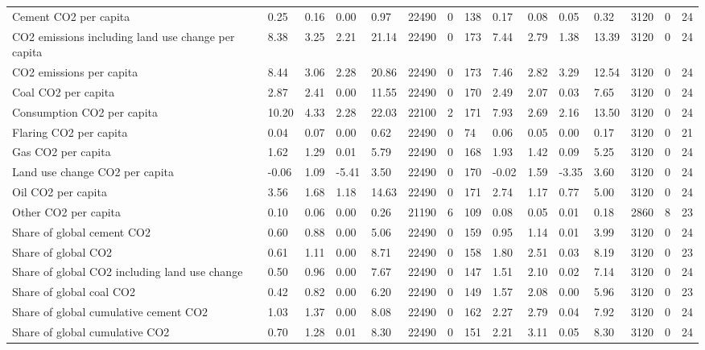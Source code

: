 \begin{longtable}{lllllllllllllll}
Cement CO2 per capita & 0.25 & 0.16 & 0.00 & 0.97 & 22490 & 0 & 138 & 0.17 & 0.08 & 0.05 & 0.32 & 3120 & 0 & 24\\
CO2 emissions including land use change per capita & 8.38 & 3.25 & 2.21 & 21.14 & 22490 & 0 & 173 & 7.44 & 2.79 & 1.38 & 13.39 & 3120 & 0 & 24\\
CO2 emissions per capita & 8.44 & 3.06 & 2.28 & 20.86 & 22490 & 0 & 173 & 7.46 & 2.82 & 3.29 & 12.54 & 3120 & 0 & 24\\
Coal CO2 per capita & 2.87 & 2.41 & 0.00 & 11.55 & 22490 & 0 & 170 & 2.49 & 2.07 & 0.03 & 7.65 & 3120 & 0 & 24\\
\addlinespace
Consumption CO2 per capita & 10.20 & 4.33 & 2.28 & 22.03 & 22100 & 2 & 171 & 7.93 & 2.69 & 2.16 & 13.50 & 3120 & 0 & 24\\
Flaring CO2 per capita & 0.04 & 0.07 & 0.00 & 0.62 & 22490 & 0 & 74 & 0.06 & 0.05 & 0.00 & 0.17 & 3120 & 0 & 21\\
Gas CO2 per capita & 1.62 & 1.29 & 0.01 & 5.79 & 22490 & 0 & 168 & 1.93 & 1.42 & 0.09 & 5.25 & 3120 & 0 & 24\\
Land use change CO2 per capita & -0.06 & 1.09 & -5.41 & 3.50 & 22490 & 0 & 170 & -0.02 & 1.59 & -3.35 & 3.60 & 3120 & 0 & 24\\
Oil CO2 per capita & 3.56 & 1.68 & 1.18 & 14.63 & 22490 & 0 & 171 & 2.74 & 1.17 & 0.77 & 5.00 & 3120 & 0 & 24\\
\addlinespace
Other CO2 per capita & 0.10 & 0.06 & 0.00 & 0.26 & 21190 & 6 & 109 & 0.08 & 0.05 & 0.01 & 0.18 & 2860 & 8 & 23\\
Share of global cement CO2 & 0.60 & 0.88 & 0.00 & 5.06 & 22490 & 0 & 159 & 0.95 & 1.14 & 0.01 & 3.99 & 3120 & 0 & 24\\
Share of global CO2 & 0.61 & 1.11 & 0.00 & 8.71 & 22490 & 0 & 158 & 1.80 & 2.51 & 0.03 & 8.19 & 3120 & 0 & 23\\
Share of global CO2 including land use change & 0.50 & 0.96 & 0.00 & 7.67 & 22490 & 0 & 147 & 1.51 & 2.10 & 0.02 & 7.14 & 3120 & 0 & 24\\
Share of global coal CO2 & 0.42 & 0.82 & 0.00 & 6.20 & 22490 & 0 & 149 & 1.57 & 2.08 & 0.00 & 5.96 & 3120 & 0 & 23\\
\addlinespace
Share of global cumulative cement CO2 & 1.03 & 1.37 & 0.00 & 8.08 & 22490 & 0 & 162 & 2.27 & 2.79 & 0.04 & 7.92 & 3120 & 0 & 24\\
Share of global cumulative CO2 & 0.70 & 1.28 & 0.01 & 8.30 & 22490 & 0 & 151 & 2.21 & 3.11 & 0.05 & 8.30 & 3120 & 0 & 24\\

\end{longtable}
